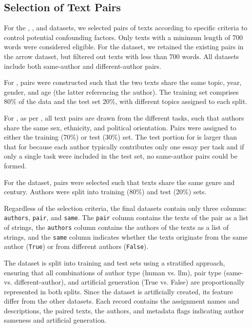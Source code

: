 \subsection{Selection of Text Pairs}
\label{subsec:dataset_text_pair_selection}

For the \dataBlog{}, \dataStudent{}, and \dataGutenberg{} datasets, we selected pairs of texts according to specific criteria to control potential confounding factors.
Only texts with a minimum length of \num{700} words were considered eligible. 
For the \dataPan{} dataset, we retained the existing pairs in the arrow dataset, but filtered out texts with less than 700 words. 
All datasets include both same-author and different-author pairs. 

For \dataBlog{}, pairs were constructed such that the two texts share the same topic, year, gender, and age (the latter referencing the author). 
The training set comprises 80\% of the data and the test set 20\%, with different topics assigned to each split.

For \dataStudent{}, as per \citep{koppel_determining_2014}, all text pairs are drawn from the different tasks, such that authors share the same sex, ethnicity, and political orientation. 
Pairs were assigned to either the training (70\%) or test (30\%) set. 
The test portion for \dataStudent{} is larger than that for \dataBlog{} because each author typically contributes only one essay per task and if only a single task were included in the test set, no same-author pairs could be formed. 

For the \dataGutenberg{} dataset, pairs were selected such that texts share the same genre and century. 
Authors were split into training (80\%) and test (20\%) sets.

Regardless of the selection criteria, the final datasets contain only three columns: \texttt{authors}, \texttt{pair}, and \texttt{same}.
The \texttt{pair} column contains the texts of the pair as a list of strings,
the \texttt{authors} column contains the authors of the texts as a list of strings,
and the \texttt{same} column indicates whether the texts originate from the same author (\texttt{True}) or from different authors (\texttt{False}).

The \dataArtificialStudent{} dataset is split into training and test sets using a stratified approach, ensuring that all combinations of author type (human vs. \ac{llm}), pair type (same- vs. different-author), and artificial generation (True vs. False) are proportionally represented in both splits. 
Since the \dataArtificialStudent{} dataset is artificially created, its feature differ from the other datasets. 
Each record contains the assignment names and descriptions, the paired texts, the authors, and metadata flags indicating author sameness and artificial generation.

